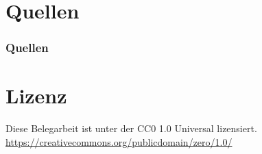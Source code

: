 \documentclass{beamer}              %
\begin{document}
\section{Quellen}
\begin{frame}[allowframebreaks]
        \frametitle{Quellen}
        
        
\end{frame}

\section{Lizenz}
\begin{frame}{}
   \centering Diese Belegarbeit ist unter der CC0 1.0 Universal lizensiert. \url{https://creativecommons.org/publicdomain/zero/1.0/}
\end{frame}
\end{document}
